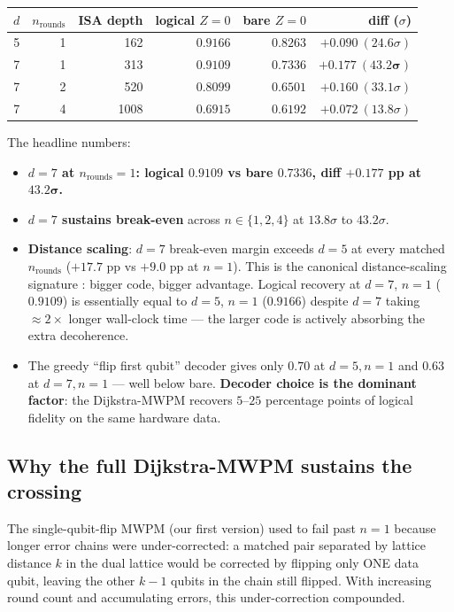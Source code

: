 \documentclass[11pt,letterpaper]{article}
\begin{document}
\begin{center}
\begin{tabular}{rrrrrr}
\toprule
$d$ & $n_{\mathrm{rounds}}$ & ISA depth & logical $Z = 0$ & bare $Z = 0$ & diff ($\sigma$) \\
\midrule
5 & 1 & 162  & $0.9166$ & $0.8263$ & $+0.090\ (24.6\sigma)$ \\
7 & 1 & 313  & $\bm{0.9109}$ & $0.7336$ & $\bm{+0.177\ (43.2\sigma)}$ \\
7 & 2 & 520  & $0.8099$ & $0.6501$ & $+0.160\ (33.1\sigma)$ \\
7 & 4 & 1008 & $0.6915$ & $0.6192$ & $+0.072\ (13.8\sigma)$ \\
\bottomrule
\end{tabular}
\end{center}

The headline numbers:
\begin{itemize}[leftmargin=*,itemsep=0pt]
\item \textbf{$d = 7$ at $n_{\mathrm{rounds}} = 1$: logical $0.9109$ vs bare $0.7336$, diff $+0.177$ pp at $\mathbf{43.2\sigma}$.}
\item \textbf{$d = 7$ sustains break-even} across $n \in \{1, 2, 4\}$ at $13.8\sigma$ to $43.2\sigma$.
\item \textbf{Distance scaling}: $d = 7$ break-even margin exceeds $d = 5$ at every matched $n_{\mathrm{rounds}}$ ($+17.7$ pp vs $+9.0$ pp at $n = 1$). This is the canonical distance-scaling signature \cite{willow_precursor}: bigger code, bigger advantage. Logical recovery at $d = 7$, $n = 1$ ($0.9109$) is essentially equal to $d = 5$, $n = 1$ ($0.9166$) despite $d = 7$ taking $\approx 2\times$ longer wall-clock time --- the larger code is actively absorbing the extra decoherence.
\item The greedy ``flip first qubit'' decoder gives only $0.70$ at $d = 5, n = 1$ and $0.63$ at $d = 7, n = 1$ --- well below bare. \textbf{Decoder choice is the dominant factor}: the Dijkstra-MWPM recovers $5$--$25$ percentage points of logical fidelity on the same hardware data.
\end{itemize}

\subsection{Why the full Dijkstra-MWPM sustains the crossing}

The single-qubit-flip MWPM (our first version) used to fail past $n = 1$ because longer error chains were under-corrected: a matched pair separated by lattice distance $k$ in the dual lattice would be corrected by flipping only ONE data qubit, leaving the other $k - 1$ qubits in the chain still flipped. With increasing round count and accumulating errors, this under-correction compounded.
\end{document}
